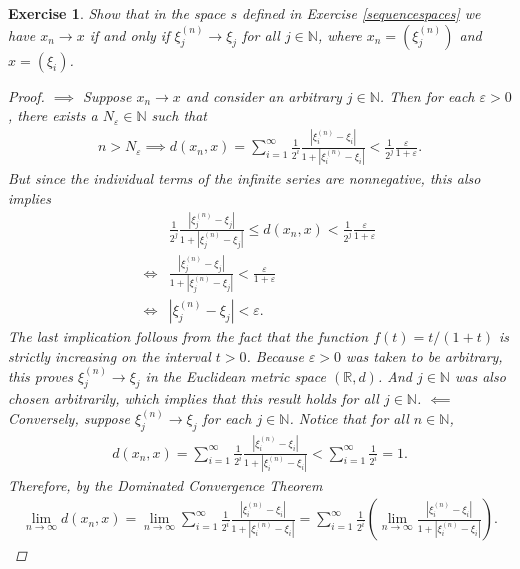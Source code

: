 \documentclass[11pt]{article}
\theoremstyle{mystyle}
\newtheorem{protoexer}{Exercise}[section]
\newenvironment{exer}
{\colorlet{shadecolor}{blue!15}\begin{shaded}\begin{protoexer}}
{\end{protoexer}\end{shaded}}
\newcommand{\0}{\mathbf{0}}
\begin{document}
\begin{exer}
Show that in the space $s$ defined in Exercise \ref{sequencespaces} we have $x_n \longrightarrow x$ if and only if $\xi_j^{(n)} \longrightarrow \xi_j$ for all $j \in \mathbb{N}$, where $x_n = (\xi_j^{(n)})$ and $x = (\xi_i)$.
\begin{proof}
$\implies$ Suppose $x_n \longrightarrow x$ and consider an arbitrary $j \in \mathbb{N}$. Then for each $\varepsilon > 0$, there exists a $N_{\varepsilon} \in \mathbb{N}$ such that 
\begin{align*}
   n > N_{\varepsilon} \implies d(x_n, x) = \sum_{i=1}^{\infty} \frac{1}{2^i} \frac{|\xi_i^{(n)} - \xi_i|}{1 + |\xi_i^{(n)} - \xi_i|} < \frac{1}{2^j}\frac{\varepsilon}{1+\varepsilon}.
\end{align*}
But since the individual terms of the infinite series are nonnegative, this also implies 
\begin{align*}
    &\frac{1}{2^j} \frac{|\xi_j^{(n)} - \xi_j|}{1 + |\xi_j^{(n)} - \xi_j|} \leq d(x_n, x) < \frac{1}{2^j}\frac{\varepsilon}{1+\varepsilon}\\
    \iff& \frac{|\xi_j^{(n)} - \xi_j|}{1 + |\xi_j^{(n)} - \xi_j|} < \frac{\varepsilon}{1+\varepsilon}\\
    \iff&  |\xi_j^{(n)} - \xi_j| < \varepsilon.
\end{align*}
The last implication follows from the fact that the function $f(t) = t/(1+t)$ is strictly increasing on the interval $t > 0$. Because $\varepsilon > 0$ was taken to be arbitrary, this proves $\xi_j^{(n)} \longrightarrow \xi_j$ in the Euclidean metric space $(\mathbb{R}, d)$. And $j \in \mathbb{N}$ was also chosen arbitrarily, which implies that this result holds for all $j \in \mathbb{N}$.\newline
$\impliedby$ Conversely, suppose $\xi_j^{(n)} \longrightarrow \xi_j$ for each $j \in \mathbb{N}$. Notice that for all $n \in \mathbb{N}$,
\begin{align*}
    d(x_n, x) = \sum_{i=1}^{\infty} \frac{1}{2^i}\frac{|\xi_i^{(n)} - \xi_i|}{1 + |\xi_i^{(n)} - \xi_i|} < \sum_{i=1}^{\infty}\frac{1}{2^i} = 1.
\end{align*}
Therefore, by the Dominated Convergence Theorem\footnotemark
\begin{align*}
    \lim_{n \to \infty} d(x_n, x) = \lim_{n \to \infty} \sum_{i=1}^{\infty} \frac{1}{2^i}\frac{|\xi_i^{(n)} - \xi_i|}{1 + |\xi_i^{(n)} - \xi_i|} =  \sum_{i=1}^{\infty} \frac{1}{2^i} \left( \lim_{n \to \infty}\frac{|\xi_i^{(n)} - \xi_i|}{1 + |\xi_i^{(n)} - \xi_i|} \right).
\end{align*}

\end{proof}
\end{exer}
\end{document}
